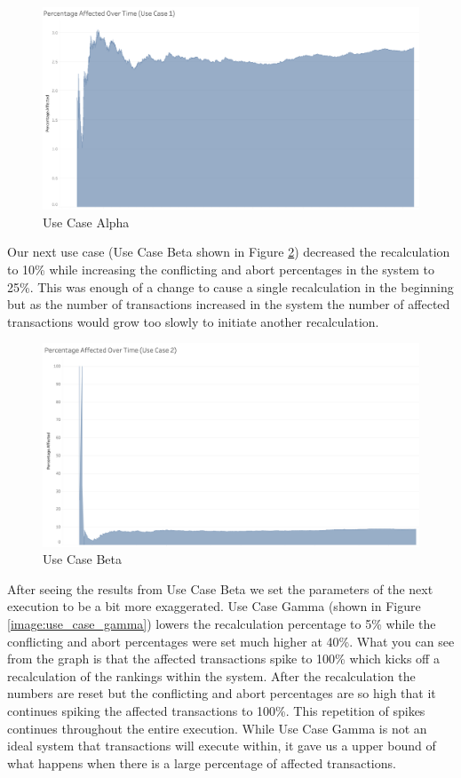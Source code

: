 \begin{figure}
\centering
\includegraphics[scale=0.35]{images/UseCase1.png}
\caption{Use Case Alpha}
\label{image:use_case_alpha}
\end{figure}

Our next use case (Use Case Beta shown in Figure \ref{image:use_case_beta}) decreased the recalculation to 10\% while increasing the conflicting and abort percentages in the system to 25\%. This was enough of a change to cause a single recalculation in the beginning but as the number of transactions increased in the system the number of affected transactions would grow too slowly to initiate another recalculation.

\begin{figure}
\centering
\includegraphics[scale=0.35]{images/UseCase2.png}
\caption{Use Case Beta}
\label{image:use_case_beta}
\end{figure}

After seeing the results from Use Case Beta we set the parameters of the next execution to be a bit more exaggerated. Use Case Gamma (shown in Figure \ref{image:use_case_gamma}) lowers the recalculation percentage to 5\% while the conflicting and abort percentages were set much higher at 40\%. What you can see from the graph is that the affected transactions spike to 100\% which kicks off a recalculation of the rankings within the system. After the recalculation the numbers are reset but the conflicting and abort percentages are so high that it continues spiking the affected transactions to 100\%. This repetition of spikes continues throughout the entire execution. While Use Case Gamma is not an ideal system that transactions will execute within, it gave us a upper bound of what happens when there is a large percentage of affected transactions.

